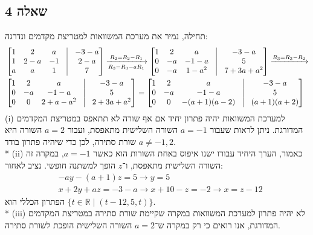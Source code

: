 \documentclass[a4paper, 10pt]{article}
\begin{document}
\begin{hebrew}
	\section{שאלה 4}
	תחילה, נמיר את מערכת המשוואות למטריצת מקדמים ונדרגה:
	\[
		\begin{aligned}
			& \begin{bmatrix}
			1 & 2 & a & \vline & -3 - a \\
			1 & 2 - a & -1 & \vline & 2 - a \\
			a & a & 1 & \vline & 7
			\end{bmatrix}
			\xrightarrow[R_3 = R_3 - aR_1]{R_2 = R_2 - R_1}
			\begin{bmatrix}
			1 & 2 & a & \vline & -3 - a \\
			0 & -a & -1 - a & \vline & 5 \\
			0 & -a & 1 - a^2 & \vline & 7 + 3a + a^2
			\end{bmatrix}
			\xrightarrow{R_3 = R_3 - R_2} \\
			& \begin{bmatrix}
			1 & 2 & a & \vline & -3 - a \\
			0 & -a & -1 - a & \vline & 5 \\
			0 & 0 & 2 + a - a^2 & \vline & 2 + 3a + a^2
			\end{bmatrix}
			=
			\begin{bmatrix}
			1 & 2 & a & \vline & -3 - a \\
			0 & -a & -1 - a & \vline & 5 \\
			0 & 0 & -(a + 1)(a - 2) & \vline & (a + 1)(a + 2)
			\end{bmatrix}
		\end{aligned}
	\]
	(i) למערכת המשוואות יהיה פתרון יחיד אם אף שורה
	לא תתאפס במטריצת המקדמים המדורגת.
	ניתן לראות שעבור $a = -1$ השורה השלישית מתאפסת,
	ועבור $a = 2$ השורה היא שורת סתירה,
	לכן כדי שיהיה פתרון בודד $a \ne -1, 2$. \\*
	(ii) כאמור, הערך היחיד עבורו ישנו איפוס באחת השורות הוא כאשר $a = -1$,
	במקרה זה השורה השלישית מתאפסת, ו־$z$ הופך למשתנה חופשי.
	נציב לאחור:
	\[
		\begin{aligned}
			& -ay - (a + 1)z = 5 \rightarrow y = 5 \\
			& x + 2y + az = -3 - a \rightarrow x + 10 - z = -2
			\rightarrow x = z - 12
		\end{aligned}
	\]
	הפתרון הכללי הוא
	$\{ t \in \mathbb{R} \mid (t - 12, 5, t) \}$. \\*
	(iii) לא יהיה פתרון למערכת המשוואות במקרה
	שקיימת שורת סתירה במטריצת המקדמים המדורגת,
	אנו רואים כי רק במקרה ש־$a = 2$ השורה השלישית הופכת לשורת סתירה.


\end{hebrew}
\end{document}
